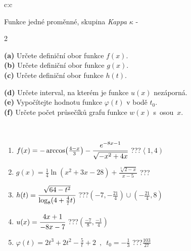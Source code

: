 \documentclass[10pt]{report}
\begin{document}
\newpage
\thispagestyle{empty}
\begin{tabular}{c:c}
\begin{minipage}[c][104.5mm][t]{0.5\linewidth}
\begin{center}
\vspace{7mm}
{\huge Funkce jedné proměnné, skupina \textit{Kappa $\kappa$} -}\\[5mm]
\begin{minipage}{0.95\linewidth}
\begin{center}
{\small \begin{multicols}{2} \raggedright
\textbf{(a)} Určete definiční obor funkce \(f(x)\). \\[1mm]
\textbf{(b)} Určete definiční obor funkce \(g(x)\). \\[1mm]
\textbf{(c)} Určete definiční obor funkce \(h(t)\). \par \columnbreak
\textbf{(d)} Určete interval, na kterém je funkce \(u(x)\) nezáporná. \\[1mm]
\textbf{(e)} Vypočítejte hodnotu funkce \(\varphi(t)\) v bodě \(t_0\). \\[1mm]
\textbf{(f)} Určete počet průsečíků grafu funkce \(w(x)\) s~osou~\(x\). \\[1mm]
\end{multicols}
}
\end{center}
\end{minipage}
\\[4mm]
\begin{minipage}{0.79\linewidth}
\begin{center}
\begin{varwidth}{\linewidth}
\begin{enumerate}
\small
\item $f(x) = -\arccos\!\left( \frac{4-x}{3} \right) - \cfrac{e^{-8x-1}}{\sqrt{-x^2+4x}}$\quad \dotfill\; ???\;\dotfill \quad $\left\langle1 , 4\right)$
\item $g(x) = \frac{1}{4} \ln{\!(x^2+3x-28)}+\frac{\sqrt[3]{2-x}}{x-5}$\quad \dotfill\; ???\;\dotfill {}
\item $h(t) = \cfrac{\sqrt{64-t^2}}{\log_8(4+\frac{4}{7}t)}$\quad \dotfill\; ???\;\dotfill \quad $\left(-7 , -\frac{21}{4}\right)\cup\left(-\frac{21}{4} , 8\right)$
\item $u(x) = \cfrac{4x+1}{-8x-7}$\quad \dotfill\; ???\;\dotfill \quad $\left(\frac{-7}{8} , \frac{-1}{4}\right)$
\item $\varphi(t) = 2t^3+2t^2-\frac{5}{t}+2 \enspace , \enspace t_0=-\frac{1}{3}$\quad \dotfill\; ???\;\dotfill \quad $\frac{103}{27}$

\end{enumerate}
\end{varwidth}
\end{center}
\end{minipage}
\end{center}
\end{minipage}
\end{tabular}
\end{document}
